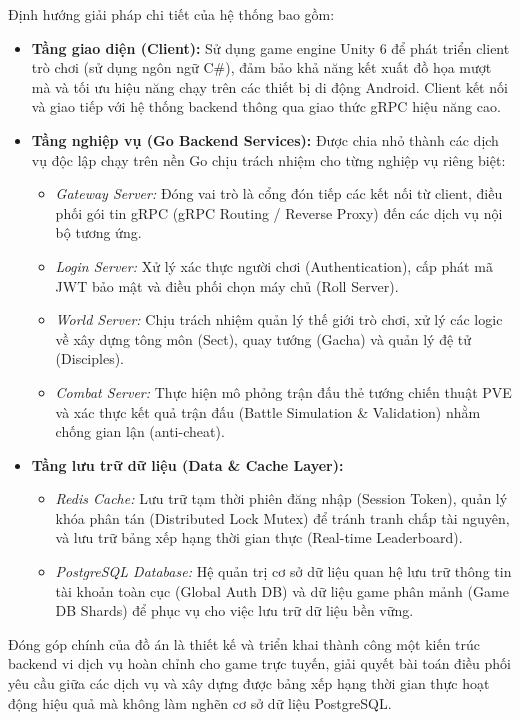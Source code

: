 \documentclass[../Project.tex]{subfiles}
\begin{document}
Định hướng giải pháp chi tiết của hệ thống bao gồm:
\begin{itemize}
    \item \textbf{Tầng giao diện (Client):} Sử dụng game engine Unity 6 để phát triển client trò chơi (sử dụng ngôn ngữ C\#), đảm bảo khả năng kết xuất đồ họa mượt mà và tối ưu hiệu năng chạy trên các thiết bị di động Android. Client kết nối và giao tiếp với hệ thống backend thông qua giao thức gRPC hiệu năng cao.
    \item \textbf{Tầng nghiệp vụ (Go Backend Services):} Được chia nhỏ thành các dịch vụ độc lập chạy trên nền Go chịu trách nhiệm cho từng nghiệp vụ riêng biệt:
    \begin{itemize}
        \item \textit{Gateway Server:} Đóng vai trò là cổng đón tiếp các kết nối từ client, điều phối gói tin gRPC (gRPC Routing / Reverse Proxy) đến các dịch vụ nội bộ tương ứng.
        \item \textit{Login Server:} Xử lý xác thực người chơi (Authentication), cấp phát mã JWT bảo mật và điều phối chọn máy chủ (Roll Server).
        \item \textit{World Server:} Chịu trách nhiệm quản lý thế giới trò chơi, xử lý các logic về xây dựng tông môn (Sect), quay tướng (Gacha) và quản lý đệ tử (Disciples).
        \item \textit{Combat Server:} Thực hiện mô phỏng trận đấu thẻ tướng chiến thuật PVE và xác thực kết quả trận đấu (Battle Simulation \& Validation) nhằm chống gian lận (anti-cheat).
    \end{itemize}
    \item \textbf{Tầng lưu trữ dữ liệu (Data \& Cache Layer):}
    \begin{itemize}
        \item \textit{Redis Cache:} Lưu trữ tạm thời phiên đăng nhập (Session Token), quản lý khóa phân tán (Distributed Lock Mutex) để tránh tranh chấp tài nguyên, và lưu trữ bảng xếp hạng thời gian thực (Real-time Leaderboard).
        \item \textit{PostgreSQL Database:} Hệ quản trị cơ sở dữ liệu quan hệ lưu trữ thông tin tài khoản toàn cục (Global Auth DB) và dữ liệu game phân mảnh (Game DB Shards) để phục vụ cho việc lưu trữ dữ liệu bền vững.
    \end{itemize}
\end{itemize}

Đóng góp chính của đồ án là thiết kế và triển khai thành công một kiến trúc backend vi dịch vụ hoàn chỉnh cho game trực tuyến, giải quyết bài toán điều phối yêu cầu giữa các dịch vụ và xây dựng được bảng xếp hạng thời gian thực hoạt động hiệu quả mà không làm nghẽn cơ sở dữ liệu PostgreSQL.
\end{document}
